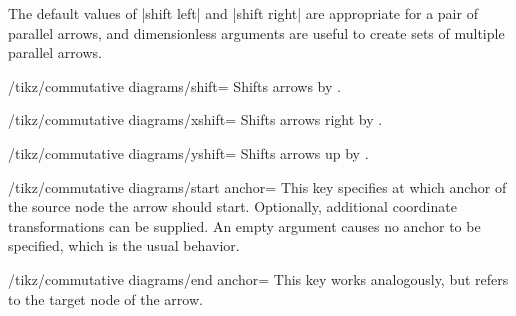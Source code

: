 \documentclass[a4paper]{ltxdoc}
\begin{document}
The default values of |shift left| and |shift right| are appropriate
for a pair of parallel arrows, and dimensionless arguments are useful
to create sets of multiple parallel arrows.
\begin{codeexample}[]
\end{codeexample}

\begin{key}{/tikz/commutative diagrams/shift=}
  Shifts arrows by .
\end{key}

\begin{key}{/tikz/commutative diagrams/xshift=}
  Shifts arrows right by .
\end{key}

\begin{key}{/tikz/commutative diagrams/yshift=}
  Shifts arrows up by .
\end{key}

\begin{codeexample}[]
\end{codeexample}

\begin{key}{/tikz/commutative diagrams/start anchor=}
  This key specifies at which anchor of the source node the arrow
  should start.  Optionally, additional coordinate transformations can
  be supplied.  An empty  argument causes no anchor to be
  specified, which is the usual behavior.
\end{key}

\begin{key}{/tikz/commutative diagrams/end anchor=}
  This key works analogously, but refers to the target node of the arrow.
\end{key}
\end{document}

